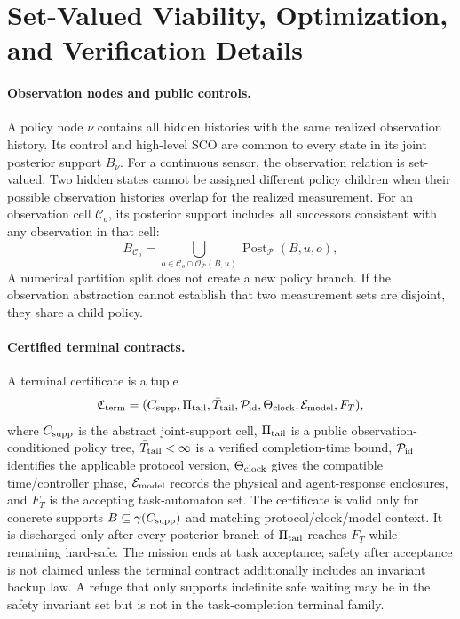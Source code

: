 \documentclass[letterpaper]{article} %
\begin{document}
\section{Set-Valued Viability, Optimization, and Verification Details}
\label{app:verification}

\paragraph{Observation nodes and public controls.}
A policy node $\nu$ contains all hidden histories with the same realized observation history. Its control and high-level SCO are common to every state in its joint posterior support $B_\nu$. For a continuous sensor, the observation relation is set-valued. Two hidden states cannot be assigned different policy children when their possible observation histories overlap for the realized measurement. For an observation cell $\mathcal C_o$, its posterior support includes all successors consistent with any observation in that cell:
\begin{equation}
B_{\mathcal C_o}=
\bigcup_{o\in\mathcal C_o\cap\mathcal O_{\mathcal P}(B,u)}
\operatorname{Post}_{\mathcal P}(B,u,o),
\label{eq:posterior-union}
\end{equation}
A numerical partition split does not create a new policy branch. If the observation abstraction cannot establish that two measurement sets are disjoint, they share a child policy.

\paragraph{Certified terminal contracts.}
A terminal certificate is a tuple
\begin{equation}
\mathfrak C_{\rm term}=
(C_{\rm supp},\Pi_{\rm tail},\bar T_{\rm tail},
\mathcal P_{\rm id},\Theta_{\rm clock},\mathcal E_{\rm model},F_T),
\label{eq:terminal-contract}
\end{equation}
where $C_{\rm supp}$ is the abstract joint-support cell, $\Pi_{\rm tail}$ is a public observation-conditioned policy tree, $\bar T_{\rm tail}<\infty$ is a verified completion-time bound, $\mathcal P_{\rm id}$ identifies the applicable protocol version, $\Theta_{\rm clock}$ gives the compatible time/controller phase, $\mathcal E_{\rm model}$ records the physical and agent-response enclosures, and $F_T$ is the accepting task-automaton set. The certificate is valid only for concrete supports $B\subseteq\gamma(C_{\rm supp})$ and matching protocol/clock/model context. It is discharged only after every posterior branch of $\Pi_{\rm tail}$ reaches $F_T$ while remaining hard-safe. The mission ends at task acceptance; safety after acceptance is not claimed unless the terminal contract additionally includes an invariant backup law. A refuge that only supports indefinite safe waiting may be in the safety invariant set but is not in the task-completion terminal family.
\end{document}
